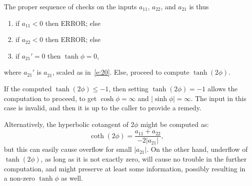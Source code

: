 \documentclass[a4paper,12pt,twoside]{article}
\begin{document}
The proper sequence of checks on the inputs $a_{11}$, $a_{22}$, and
$a_{21}$ is thus
\begin{enumerate}
\item if $a_{11}<0$ then ERROR; else
\item if $a_{22}<0$ then ERROR; else
\item if $a_{21}'=0$ then $\tanh\phi=0$,
\end{enumerate}
where $a_{21}'$ is $a_{21}^{}$, scaled as in~\eqref{e:20}.  Else,
proceed to compute $\tanh(2\phi)$.

If the computed $\tanh(2\phi)\le-1$, then setting $\tanh(2\phi)=-1$
allows the computation to proceed, to get $\cosh\phi=\infty$ and
$|\sinh\phi|=\infty$.  The input in this case is invalid, and then it
is up to the caller to provide a remedy.

Alternatively, the hyperbolic cotangent of $2\phi$ might be computed
as:
\begin{equation}
  \coth(2\phi)=\frac{a_{11}+a_{22}}{-2|a_{21}|},
  \label{e:16}
\end{equation}
but this can easily cause overflow for small $|a_{21}|$.  On the other
hand, underflow of $\tanh(2\phi)$, as long as it is not exactly zero,
will cause no trouble in the further computation, and might preserve
at least some information, possibly resulting in a non-zero
$\tanh\phi$ as well.
\end{document}

